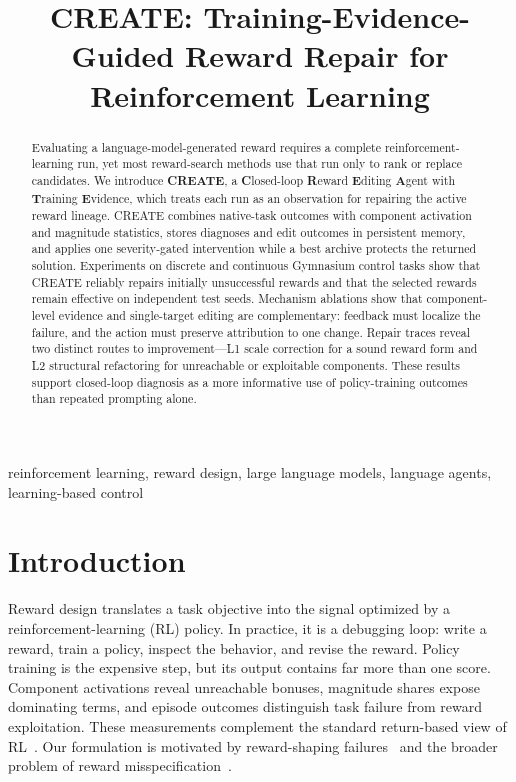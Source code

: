 \documentclass[conference]{IEEEtran}
\title{CREATE: Training-Evidence-Guided Reward Repair for Reinforcement Learning}
\author{\IEEEauthorblockN{Anonymous Authors}
\IEEEauthorblockA{Anonymous Submission}}
\begin{document}
\maketitle

\begin{abstract}
Evaluating a language-model-generated reward requires a complete
reinforcement-learning run, yet most reward-search methods use that run only
to rank or replace candidates. We introduce
\textbf{CREATE}, a \textbf{C}losed-loop \textbf{R}eward \textbf{E}diting
\textbf{A}gent with \textbf{T}raining \textbf{E}vidence, which treats each run
as an observation for repairing the active reward lineage. CREATE combines
native-task outcomes with component activation and magnitude statistics,
stores diagnoses and edit outcomes in persistent memory, and applies one
severity-gated intervention while a best archive protects the returned
solution. Experiments on discrete and continuous Gymnasium control tasks show
that CREATE reliably repairs initially unsuccessful rewards and that the
selected rewards remain effective on independent test seeds. Mechanism
ablations show that component-level evidence and single-target editing are
complementary: feedback must localize the failure, and the action must preserve
attribution to one change. Repair traces reveal two distinct routes to
improvement---L1 scale correction for a sound reward form and L2 structural
refactoring for unreachable or exploitable components. These results support
closed-loop diagnosis as a more informative use of policy-training outcomes
than repeated prompting alone.
\end{abstract}

\begin{IEEEkeywords}
reinforcement learning, reward design, large language models, language agents,
learning-based control
\end{IEEEkeywords}

\section{Introduction}
Reward design translates a task objective into the signal optimized by a
reinforcement-learning (RL) policy. In practice, it is a debugging loop: write
a reward, train a policy, inspect the behavior, and revise the reward. Policy
training is the expensive step, but its output contains far more than one
score. Component activations reveal unreachable bonuses, magnitude shares
expose dominating terms, and episode outcomes distinguish task failure from
reward exploitation. These measurements complement the standard return-based
view of RL~\cite{sutton2018rl}. Our formulation is motivated by
reward-shaping failures~\cite{ng1999policy} and the broader problem of reward
misspecification~\cite{hadfield2017inverse}.
\end{document}
